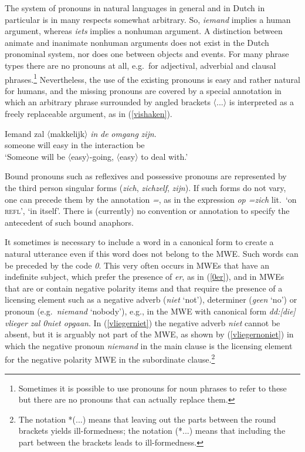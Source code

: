 \documentclass[output=paper,colorlinks,citecolor=brown]{langscibook}
\begin{document}
The system of pronouns in natural languages in general and in Dutch in particular is in many respects somewhat arbitrary. So, \textit{iemand} implies a human argument, whereas \textit{iets} implies a nonhuman argument. A distinction between animate and inanimate nonhuman arguments does not exist in the Dutch pronominal system, nor does one between objects and events. For many phrase types there are no pronouns at all, e.g.\ for adjectival, adverbial and clausal phrases.\footnote{Sometimes it is possible to use pronouns for noun phrases to refer to these but there are no pronouns that can actually replace them.} Nevertheless, the use of the existing pronouns is easy and rather natural for humans, and the missing pronouns are covered by a special annotation in which an arbitrary phrase surrounded by angled brackets 〈...〉 is interpreted as a freely replaceable argument, as in (\ref{vishaken}).

\begin{exe}
\ex \gll Iemand zal 〈makkelijk〉 \textit{in} \textit{de} \textit{omgang} \textit{zijn}.\\
someone will easy in the interaction be\\ \label{vishaken}
\glt `Someone will be 〈easy〉-going, 〈easy〉 to deal with.'
\end{exe}

Bound pronouns such as reflexives and possessive pronouns are represented by the third person singular forms (\textit{zich}, \textit{zichzelf}, \textit{zijn}). If such forms do not vary, one can precede them by the annotation \textit{=}, as in the expression \textit{op =zich} lit.\ `on \textsc{refl}', `in itself'. There is (currently) no convention or annotation to specify the antecedent of such bound anaphors.\largerpage

It sometimes is necessary to include a word in a canonical form to create a natural utterance even if this word does not belong to the MWE. Such words can be preceded by the code \textit{0}. This very often occurs in MWEs that have an indefinite subject, which prefer the presence of \textit{er}, as in (\ref{0er}), and in MWEs that are or contain negative polarity items and that require the presence of a licensing element such as a negative adverb (\textit{niet} `not'), determiner (\textit{geen} `no') or pronoun (e.g.\ \textit{niemand} `nobody'), e.g., in the MWE with canonical form \textit{dd:[die] vlieger zal 0niet opgaan}. In (\ref{vliegerniet})  the negative adverb \textit{niet} cannot be absent,  but it is arguably not part of the MWE, as shown by (\ref{vliegernoniet}) in which the negative pronoun \textit{niemand} in the main clause is the licensing element for the negative polarity MWE in the subordinate clause.\footnote{The notation *(...) means that leaving out the parts between the round brackets yields ill-formedness; the notation (*...) means that including the part between the brackets leads to ill-formedness.}
\end{document}
